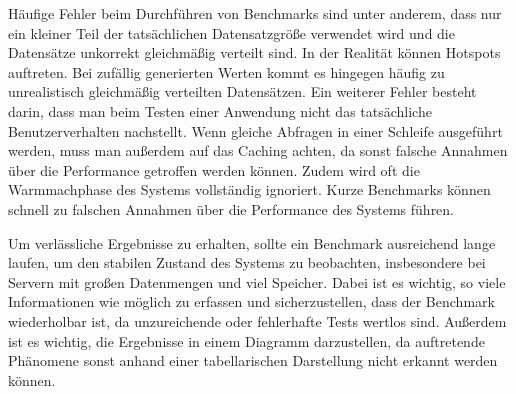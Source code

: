Häufige Fehler beim Durchführen von Benchmarks sind unter anderem, dass nur ein kleiner Teil
der tatsächlichen Datensatzgröße verwendet wird und die Datensätze unkorrekt gleichmäßig
verteilt sind. In der Realität können Hotspots auftreten. Bei zufällig generierten Werten
kommt es hingegen häufig zu unrealistisch gleichmäßig verteilten Datensätzen. Ein weiterer
Fehler besteht darin, dass man beim Testen einer Anwendung nicht das tatsächliche
Benutzerverhalten nachstellt. Wenn gleiche Abfragen in einer Schleife ausgeführt werden,
muss man außerdem auf das Caching achten, da sonst falsche Annahmen über die Performance
getroffen werden können. Zudem wird oft die Warmmachphase des Systems vollständig ignoriert.
Kurze Benchmarks können schnell zu falschen Annahmen über die Performance des Systems führen.

Um verlässliche Ergebnisse zu erhalten, sollte ein Benchmark ausreichend lange laufen,
um den stabilen Zustand des Systems zu beobachten, insbesondere bei Servern mit großen
Datenmengen und viel Speicher. Dabei ist es wichtig, so viele Informationen wie möglich zu
erfassen und sicherzustellen, dass der Benchmark wiederholbar ist, da unzureichende oder
fehlerhafte Tests wertlos sind. Außerdem ist es wichtig, die Ergebnisse in einem Diagramm
darzustellen, da auftretende Phänomene sonst anhand einer tabellarischen Darstellung nicht
erkannt werden können.


